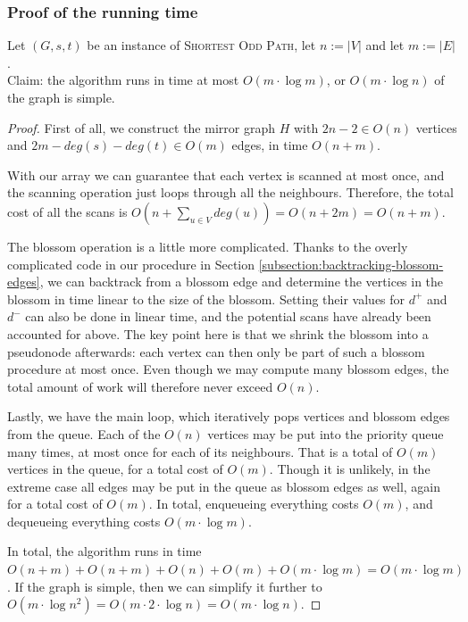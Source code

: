 \subsubsection*{Proof of the running time}
Let $(G,s,t)$ be an instance of \textsc{Shortest Odd Path}, let $n := |V|$ and let $m := |E|$. \\
Claim: the algorithm runs in time at most $O(m \cdot \log m)$, or $O(m \cdot \log n)$ of the graph is simple.
\begin{proof}  
    First of all, we construct the mirror graph $H$ with $2n-2 \in O(n)$ vertices and $2m - deg(s) - deg(t) \in O(m)$ edges, in time $O(n+m)$.
    
    With our  array we can guarantee that each vertex is scanned at most once, and the scanning operation just loops through all the neighbours. Therefore, the total cost of all the scans is $O(n + \sum_{u \in V} deg(u)) = O(n + 2m) = O(n + m)$.

    The blossom operation is a little more complicated. Thanks to the overly complicated code in our  procedure in Section \ref{subsection:backtracking-blossom-edges}, we can backtrack from a blossom edge and determine the vertices in the blossom in time linear to the size of the blossom. Setting their values for $d^+$ and $d^-$ can also be done in linear time, and the potential scans have already been accounted for above. The key point here is that we shrink the blossom into a pseudonode afterwards: each vertex can then only be part of such a blossom procedure at most once. Even though we may compute many blossom edges, the total amount of work will therefore never exceed $O(n)$.

    Lastly, we have the main loop, which iteratively pops vertices and blossom edges from the queue. Each of the $O(n)$ vertices may be put into the priority queue many times, at most once for each of its neighbours. That is a total of $O(m)$ vertices in the queue, for a total cost of $O(m)$. Though it is unlikely, in the extreme case all edges may be put in the queue as blossom edges as well, again for a total cost of $O(m)$. In total, enqueueing everything costs $O(m)$, and dequeueing everything costs $O(m \cdot \log m)$.

    In total, the algorithm runs in time $O(n+m) + O(n+m) + O(n) + O(m) + O(m \cdot \log m) = O(m \cdot \log m)$.
    If the graph is simple, then we can simplify it further to $O(m \cdot \log n^2) = O(m \cdot 2 \cdot \log n) = O(m \cdot \log n)$.
\end{proof}

